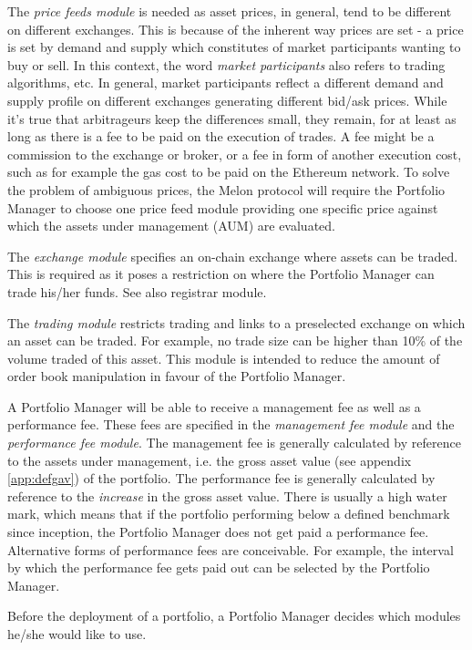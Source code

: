 \documentclass[9pt,oneside]{amsart}
\theoremstyle{plain}
\begin{document}
\begin{multicols}{2}
The \textit{price feeds module} is needed as asset prices, in general, tend to be different on different exchanges. This is because of the inherent way prices are set - a price is set by demand and supply which constitutes of market participants wanting to buy or sell. In this context, the word \textit{market participants} also refers to trading algorithms, etc. In general, market participants reflect a different demand and supply profile on different exchanges generating different bid/ask prices. While it's true that arbitrageurs keep the differences small, they remain, for at least as long as there is a fee to be paid on the execution of trades. A fee might be a commission to the exchange or broker, or a fee in form of another execution cost, such as for example the gas cost to be paid on the Ethereum network. To solve the problem of ambiguous prices, the Melon protocol will require the Portfolio Manager to choose one price feed module providing one specific price against which the assets under management (AUM) are evaluated.

The \textit{exchange module} specifies an on-chain exchange where assets can be traded. This is required as it poses a restriction on where the Portfolio Manager can trade his/her funds. See also registrar module.

The \textit{trading module} restricts trading and links to a preselected exchange on which an asset can be traded. For example, no trade size can be higher than 10\% of the volume traded of this asset. This module is intended to reduce the amount of order book manipulation in favour of the Portfolio Manager.

A Portfolio Manager will be able to receive a management fee as well as a performance fee. These fees are specified in the \textit{management fee module} and the \textit{performance fee module}. The management fee is generally calculated by reference to the assets under management, i.e. the gross asset value (see appendix \ref{app:defgav}) of the portfolio. The performance fee is generally calculated by reference to the \textit{increase} in the gross asset value. There is usually a high water mark, which means that if the portfolio performing below a defined benchmark since inception, the Portfolio Manager does not get paid a performance fee. Alternative forms of performance fees are conceivable. For example, the interval by which the performance fee gets paid out can be selected by the Portfolio Manager.

Before the deployment of a portfolio, a Portfolio Manager decides which modules he/she would like to use.


\end{multicols}
\end{document}
